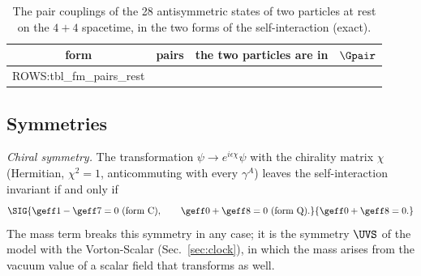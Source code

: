 \begin{table}
\caption{\label{tab:pairsrest}The pair couplings of the 28 antisymmetric states of two particles at
rest on the $4+4$ spacetime, in the two forms of the self-interaction (exact).}
\begin{ruledtabular}
\begin{tabular}{crll}
form & pairs & the two particles are in & $\Gpair$ \\
\hline
{{ROWS:tbl_fm_pairs_rest}}
\end{tabular}
\end{ruledtabular}
\end{table}

\subsection{Symmetries}
\label{sec:selfsym}

\emph{Chiral symmetry.} The transformation $\psi\to e^{i\epsilon\chi}\psi$ with the chirality matrix
$\chi$ (Hermitian, $\chi^{2}=1$, anticommuting with every $\gamma^{A}$) leaves the self-interaction
invariant if and only if
\begin{equation}
\SIG{\geff1-\geff7=0\ \text{(form C)},\qquad\geff0+\geff8=0\ \text{(form Q)}.}{\geff0+\geff8=0 .}
\label{eq:chiralcond}
\end{equation}
The
mass term breaks this symmetry in any case; it is the symmetry $\UVS$ of the model with the
Vorton-Scalar (Sec.~\ref{sec:clock}), in which the mass arises from the vacuum value of a scalar
field that transforms as well.

